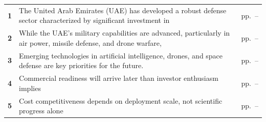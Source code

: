 \documentclass[10pt,a4paper]{article}
\begin{document}
\begin{tabularx}{\linewidth}{p{8mm}Yp{29mm}}
\textcolor{BOBlue}{\bfseries 1} & The United Arab Emirates (UAE) has developed a robust defense sector characterized by significant investment in & {\color{BOMuted}pp.~\pageref{chap:1}--\pageref{chap:1:end}} \\[3pt]
\textcolor{BOBlue}{\bfseries 2} & While the UAE's military capabilities are advanced, particularly in air power, missile defense, and drone warfare, & {\color{BOMuted}pp.~\pageref{chap:2}--\pageref{chap:2:end}} \\[3pt]
\textcolor{BOBlue}{\bfseries 3} & Emerging technologies in artificial intelligence, drones, and space defense are key priorities for the future. & {\color{BOMuted}pp.~\pageref{chap:3}--\pageref{chap:3:end}} \\[3pt]
\textcolor{BOBlue}{\bfseries 4} & Commercial readiness will arrive later than investor enthusiasm implies & {\color{BOMuted}pp.~\pageref{chap:4}--\pageref{chap:4:end}} \\[3pt]
\textcolor{BOBlue}{\bfseries 5} & Cost competitiveness depends on deployment scale, not scientific progress alone & {\color{BOMuted}pp.~\pageref{chap:5}--\pageref{chap:5:end}} \\[3pt]
\end{tabularx}
\clearpage
\end{document}
